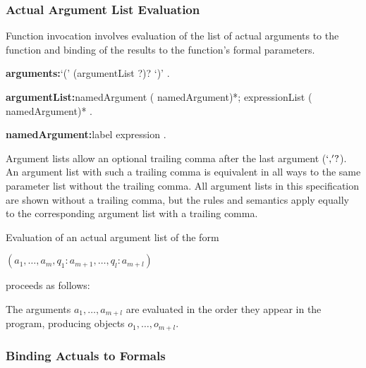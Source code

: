 \documentclass{article}
\begin{document}



\subsubsection{Actual Argument List Evaluation}

\LMHash{}
Function invocation involves evaluation of the list of actual arguments to the function and binding of the results to the function's formal parameters.

\begin{grammar}
{\bf arguments:}`(' (argumentList \gcomma{}?)? `)'
  .

{\bf argumentList:}namedArgument (\gcomma{} namedArgument)*;
  expressionList (\gcomma{} namedArgument)*
  .

{\bf namedArgument:}label expression
  .
\end{grammar}

Argument lists allow an optional trailing comma after the last argument ($`,\!'?$).
An argument list with such a trailing comma is equivalent in all ways to the same parameter list without the trailing comma.
All argument lists in this specification are shown without a trailing comma, but the rules and semantics apply equally to the corresponding argument list with a trailing comma.

\LMHash{}
Evaluation of an actual argument list of the form

$(a_1, \ldots, a_m, q_1: a_{m+1}, \ldots, q_l: a_{m+l})$

proceeds as follows:

\LMHash{}
The arguments $a_1, \ldots, a_{m+l}$ are evaluated in the order they appear in the program, producing objects $o_1, \ldots, o_{m+l}$.



\subsubsection{Binding Actuals to Formals}
\end{document}
